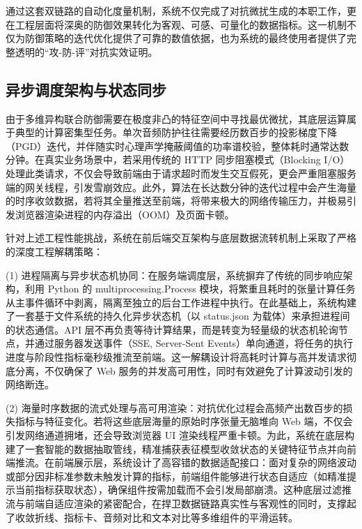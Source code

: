 通过这套双链路的自动化度量机制，系统不仅完成了对抗微扰生成的本职工作，更在工程层面将深奥的防御效果转化为客观、可感、可量化的数据指标。这一机制不仅为防御策略的迭代优化提供了可靠的数值依据，也为系统的最终使用者提供了完整透明的``攻-防-评''对抗实效证明。

\subsection{异步调度架构与状态同步}\label{ux5f02ux6b65ux8c03ux5ea6ux67b6ux6784ux4e0eux9ad8ux53efux7528ux72b6ux6001ux5c55ux793a}

由于多维异构联合防御需要在极度非凸的特征空间中寻找最优微扰，其底层运算属于典型的计算密集型任务。单次音频防护往往需要经历数百步的投影梯度下降（PGD）迭代，并伴随实时心理声学掩蔽阈值的功率谱校验，整体耗时通常达数分钟。在真实业务场景中，若采用传统的
HTTP 同步阻塞模式（Blocking
I/O）处理此类请求，不仅会导致前端由于请求超时而发生交互假死，更会严重阻塞服务端的网关线程，引发雪崩效应。此外，算法在长达数分钟的迭代过程中会产生海量的时序收敛数据，若将其全量推送至前端，将带来极大的网络传输压力，并极易引发浏览器渲染进程的内存溢出（OOM）及页面卡顿。

针对上述工程性能挑战，系统在前后端交互架构与底层数据流转机制上采取了严格的深度工程解耦策略：

(1)
进程隔离与异步状态机协同：在服务端调度层，系统摒弃了传统的同步响应架构，利用
Python 的 multiprocessing.Process
模块，将繁重且耗时的张量计算任务从主事件循环中剥离，隔离至独立的后台工作进程中执行。在此基础上，系统构建了一套基于文件系统的持久化异步状态机（以
status.json 为载体）来承担进程间的状态通信。API
层不再负责等待计算结果，而是转变为轻量级的状态机轮询节点，并通过服务器发送事件（SSE,
Server-Sent
Events）单向通道，将任务的执行进度与阶段性指标毫秒级推流至前端。这一解耦设计将高耗时计算与高并发请求彻底分离，不仅确保了
Web 服务的并发高可用性，同时有效避免了计算波动引发的网络断连。

(2)
海量时序数据的流式处理与高可用渲染：对抗优化过程会高频产出数百步的损失指标与特征变化。若将这些底层海量的原始时序张量无脑堆向
Web 端，不仅会引发网络通道拥堵，还会导致浏览器 UI
渲染线程严重卡顿。为此，系统在底层构建了一套智能的数据抽取管线，精准捕获表征模型收敛状态的关键特征节点并向前端推流。在前端展示层，系统设计了高容错的数据适配接口：面对复杂的网络波动或部分因非标准参数未触发计算的指标，前端组件能够进行状态自适应（如精准提示当前指标获取状态），确保组件按需加载而不会引发局部崩溃。这种底层过滤推流与前端自适应渲染的紧密配合，在捍卫数据链路真实性与客观性的同时，支撑起了收敛折线、指标卡、音频对比和文本对比等多维组件的平滑运转。

